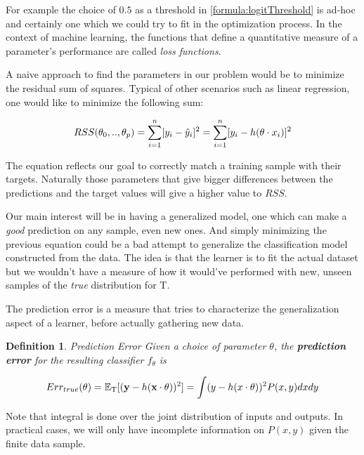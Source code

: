 \documentclass{article}%
\newcommand{\Expect}{{\mathbb{E}}}
\newtheorem{definition}{Definition}[subsection]
\theoremstyle{definition}
\begin{document}
For example the choice of $0.5$ as a threshold in \ref{formula:logitThreshold} is ad-hoc and certainly one which we could try to fit in the optimization process. In the context of machine learning, the functions that define a quantitative measure of a parameter's performance are called \textit{loss functions}.

A naive approach to find the parameters in our problem would be to minimize the residual sum of squares. Typical of other scenarios such as linear regression, one would like to minimize the following sum:  


\begin{equation} \label{eq:rss}
RSS(\theta_0,..,\theta_p)  = \sum_{i=1}^n [y_i - \hat{y}_i]^2  \\
=  \sum_{i=1}^n [y_i - h( \theta \cdot x_i)]^2
\end{equation}

The equation reflects our goal to correctly match a training sample with their targets. Naturally those parameters that give bigger differences between the predictions and the target values will give a higher value to $RSS$.

Our main interest will be in having a generalized model, one which can make a \textit{good} prediction on any sample, even new ones. And simply minimizing the previous equation could be a bad attempt to generalize the classification model constructed from the data. The idea is that the learner is to fit the actual dataset but we wouldn't have a measure of how it would've performed with new, unseen samples of the \textit{true} distribution for $\mathrm{T}$. 

The prediction error is a measure that tries to characterize the generalization aspect of a learner, before actually gathering new data.

\begin{definition}{Prediction Error}
	Given a choice of parameter $\theta$, the \textbf{prediction error} for the resulting classifier $f_\theta$ is
	
	\[
	Err_{true}(\theta)  = \Expect_{ \mathrm{T}}[(\textbf{y} - h(\textbf{x} \cdot \theta) )^2] \\
	= \int (y - h(x \cdot \theta) )^2 P(x,y)dxdy
	\]
\end{definition}

Note that integral is done over the joint distribution of inputs and outputs. In practical cases, we will only have incomplete information on $P(x,y)$ given the finite data sample.
\end{document}
